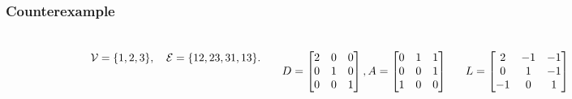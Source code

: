 \documentclass{beamer}
\begin{document}
\begin{frame}
\frametitle{Counterexample}
\begin{columns}
    
    \begin{figure}[htbp]
        \centering
        \includegraphics[width=4cm]{figures/Fig2-ConnectedDigraph.jpeg}
        \label{ConnectedDigraph}
    \end{figure}

    \begin{equation}
        \mathcal{V} = \{1, 2, 3 \},\quad \mathcal{E}=\{12, 23, 31, 13\}.
        \notag
    \end{equation}

    \begin{equation}
        D = \left[
        \begin{matrix}
            2 & 0 & 0 \\
            0 & 1 & 0 \\
            0 & 0 & 1 
        \end{matrix}
        \right],
        A = \left[
        \begin{matrix}
            0 & 1 & 1 \\
            0 & 0 & 1 \\
            1 & 0 & 0 
        \end{matrix}
        \right]
        \notag
    \end{equation}

    \begin{equation}
        L = \left[
        \begin{matrix}
            2 & -1 & -1 \\
            0 & 1 & -1 \\
            -1 & 0 & 1 
        \end{matrix}
        \right]
        \notag
    \end{equation}

\end{columns}
\end{frame}
\end{document}

